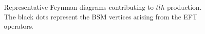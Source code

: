 \documentclass[reprint, aps,prd, preprintnumbers,groupedaddress,nofootinbib]{revtex4-1}
\begin{document}
\begin{figure}[t!]
    \caption{Representative Feynman diagrams contributing to $t \bar{t} h$ production. The black dots represent the BSM vertices arising from the EFT operators.}
    \label{fig:feynman_diagrams}
\end{figure}
\end{document}
